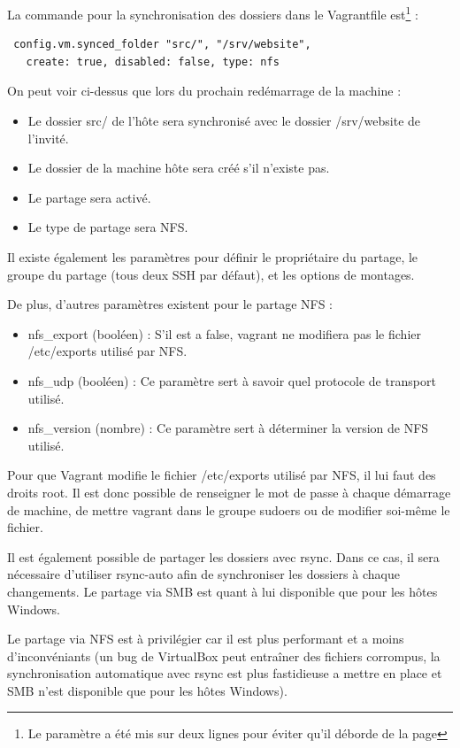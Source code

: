 \documentclass[12pt,a4paper]{article}
\begin{document}
La commande pour la synchronisation des dossiers dans le Vagrantfile est\footnote{Le paramètre a été mis sur deux lignes pour éviter qu'il déborde de la page} :
\begin{lstlisting}
 config.vm.synced_folder "src/", "/srv/website", 
   create: true, disabled: false, type: nfs
\end{lstlisting}
On peut voir ci-dessus que lors du prochain redémarrage de la machine :
\begin{itemize}
	\item{Le dossier src/ de l'hôte sera synchronisé avec le dossier /srv/website de l'invité.}
	\item{Le dossier de la machine hôte sera créé s'il n'existe pas.}
	\item{Le partage sera activé.}
	\item{Le type de partage sera NFS.}
\end{itemize}
Il existe également les paramètres pour définir le propriétaire du partage, le groupe du partage (tous deux SSH par défaut), et les options de montages.

De plus, d'autres paramètres existent pour le partage NFS : 
\begin{itemize}
	\item{nfs\_export (booléen) : S'il est a false, vagrant ne modifiera pas le fichier /etc/exports utilisé par NFS.}
	\item{nfs\_udp (booléen) : Ce paramètre sert à savoir quel protocole de transport utilisé.}
	\item{nfs\_version (nombre) : Ce paramètre sert à déterminer la version de NFS utilisé.}
\end{itemize}
Pour que Vagrant modifie le fichier /etc/exports utilisé par NFS, il lui faut des droits root. Il est donc possible de renseigner le mot de passe à chaque démarrage de machine, de mettre vagrant dans le groupe sudoers ou de modifier soi-même le fichier.

Il est également possible de partager les dossiers avec rsync. Dans ce cas, il sera nécessaire d'utiliser rsync-auto afin de synchroniser les dossiers à chaque changements. Le partage via SMB est quant à lui disponible que pour les hôtes Windows. 

Le partage via NFS est à privilégier car il est plus performant et a moins d'inconvéniants (un bug de VirtualBox peut entraîner des fichiers corrompus, la synchronisation automatique avec rsync est plus fastidieuse a mettre en place et SMB n'est disponible que pour les hôtes Windows).
\end{document}
